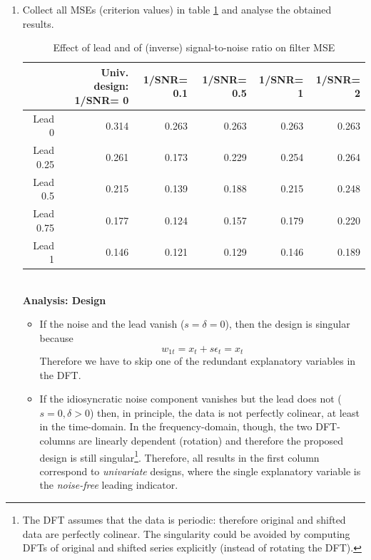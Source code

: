 \documentclass[a4paper]{book}
\begin{document}
\begin{enumerate}
\begin{Schunk}
\begin{Sinput}
{{+ # If the idiosyncratic noise is zero, then we use a univariate design
+   if (i==1)
+      weight_func<-weight_func[,-2]
+ # Compute optimal filters and derive the (frequency-domain) MSE
+     mdfa_obj<-MDFA_mse(L,weight_func,Lag,Gamma)$mdfa_obj 
+ # Store the MSE
+     lead_snr_mat[j,i]<-mdfa_obj$MS_error
+   }
+ }
\end{Sinput}
\end{Schunk}
\item Collect all MSEs (criterion values) in table \ref{lead_snr_mat} and analyse the obtained results.
\begin{table}[ht]
\centering
\begin{tabular}{rrrrrr}
  \hline
 & Univ. design: 1/SNR= 0  & 1/SNR= 0.1  & 1/SNR= 0.5  & 1/SNR= 1  & 1/SNR= 2  \\ 
  \hline
Lead  0  & 0.314 & 0.263 & 0.263 & 0.263 & 0.263 \\ 
  Lead  0.25  & 0.261 & 0.173 & 0.229 & 0.254 & 0.264 \\ 
  Lead  0.5  & 0.215 & 0.139 & 0.188 & 0.215 & 0.248 \\ 
  Lead  0.75  & 0.177 & 0.124 & 0.157 & 0.179 & 0.220 \\ 
  Lead  1  & 0.146 & 0.121 & 0.129 & 0.146 & 0.189 \\ 
   \hline
\end{tabular}
\caption{Effect of lead and of (inverse) signal-to-noise ratio on filter MSE} 
\label{lead_snr_mat}
\end{table}\\
\textbf{Analysis: Design}
\begin{itemize}
\item If the noise and the lead vanish ($s=\delta=0$), then the design is singular because 
\[w_{1t}=x_t+s\epsilon_t=x_t
\]
Therefore we have to skip one of the redundant explanatory variables in the DFT.
\item If the idiosyncratic noise component vanishes but the lead does not ($s=0, \delta>0$) then, in principle, the data is not perfectly colinear, at least in the time-domain. In the frequency-domain, though, the two DFT-columns are linearly dependent (rotation) and therefore the proposed design is still singular\footnote{The DFT assumes that the data is periodic: therefore original and shifted data are perfectly colinear. The singularity could be avoided by computing DFTs of original and shifted series explicitly (instead of rotating the DFT).}. Therefore, all results in the first column correspond to \emph{univariate} designs, where the single explanatory variable is the \emph{noise-free} leading indicator.

\end{itemize}
\end{enumerate}
\end{document}
